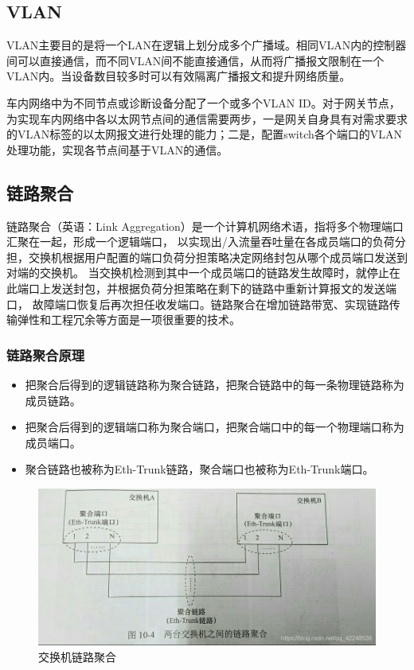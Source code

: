 \subsection{VLAN}
VLAN主要目的是将一个LAN在逻辑上划分成多个广播域。相同VLAN内的控制器间可以直接通信，而不同VLAN间不能直接通信，从而将广播报文限制在一个VLAN内。当设备数目较多时可以有效隔离广播报文和提升网络质量。

车内网络中为不同节点或诊断设备分配了一个或多个VLAN ID。对于网关节点，为实现车内网络中各以太网节点间的通信需要两步，一是网关自身具有对需求要求的VLAN标签的以太网报文进行处理的能力；二是，配置switch各个端口的VLAN处理功能，实现各节点间基于VLAN的通信。

\subsection{链路聚合}
链路聚合\cite{LianLuJuHeKnowledgeWarehouseCSDNBoKe2021}（英语：Link Aggregation）是一个计算机网络术语，指将多个物理端口汇聚在一起，形成一个逻辑端口，
以实现出/入流量吞吐量在各成员端口的负荷分担，交换机根据用户配置的端口负荷分担策略决定网络封包从哪个成员端口发送到对端的交换机。
当交换机检测到其中一个成员端口的链路发生故障时，就停止在此端口上发送封包，并根据负荷分担策略在剩下的链路中重新计算报文的发送端口，
故障端口恢复后再次担任收发端口。链路聚合在增加链路带宽、实现链路传输弹性和工程冗余等方面是一项很重要的技术。

\subsubsection{链路聚合原理}

\begin{itemize}
    \item 把聚合后得到的逻辑链路称为聚合链路，把聚合链路中的每一条物理链路称为成员链路。
    \item 把聚合后得到的逻辑端口称为聚合端口，把聚合端口中的每一个物理端口称为成员端口。
    \item 聚合链路也被称为Eth-Trunk链路，聚合端口也被称为Eth-Trunk端口。
\end{itemize}

\begin{figure}[ht]
    \centering
    \includegraphics[scale=0.5]{pic/20190414170741211.jpg}
    \caption{交换机链路聚合}
    \label{fig:switch_link_aggre}
\end{figure}

